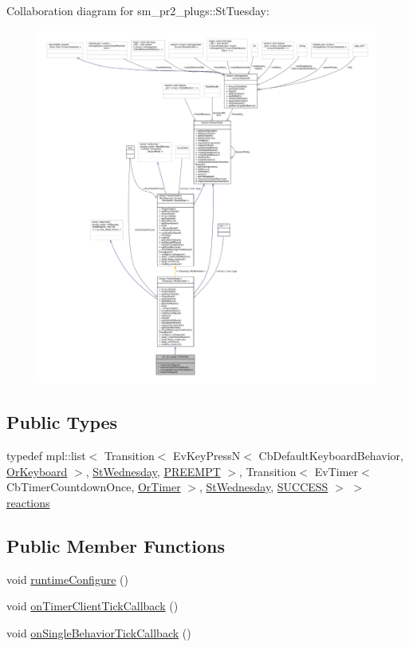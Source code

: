 Collaboration diagram for sm\+\_\+pr2\+\_\+plugs\+:\+:St\+Tuesday\+:
\nopagebreak
\begin{figure}[H]
\begin{center}
\leavevmode
\includegraphics[width=350pt]{structsm__pr2__plugs_1_1StTuesday__coll__graph}
\end{center}
\end{figure}
\subsection*{Public Types}
\begin{DoxyCompactItemize}
\item 
typedef mpl\+::list$<$ Transition$<$ Ev\+Key\+PressN$<$ Cb\+Default\+Keyboard\+Behavior, \hyperlink{classsm__pr2__plugs_1_1OrKeyboard}{Or\+Keyboard} $>$, \hyperlink{structsm__pr2__plugs_1_1StWednesday}{St\+Wednesday}, \hyperlink{classPREEMPT}{P\+R\+E\+E\+M\+PT} $>$, Transition$<$ Ev\+Timer$<$ Cb\+Timer\+Countdown\+Once, \hyperlink{classsm__pr2__plugs_1_1OrTimer}{Or\+Timer} $>$, \hyperlink{structsm__pr2__plugs_1_1StWednesday}{St\+Wednesday}, \hyperlink{classSUCCESS}{S\+U\+C\+C\+E\+SS} $>$ $>$ \hyperlink{structsm__pr2__plugs_1_1StTuesday_a3ee46b54b411275e6c623068895e7e1a}{reactions}
\end{DoxyCompactItemize}
\subsection*{Public Member Functions}
\begin{DoxyCompactItemize}
\item 
void \hyperlink{structsm__pr2__plugs_1_1StTuesday_a3773df05f080efdd418f48f49d07f4a8}{runtime\+Configure} ()
\item 
void \hyperlink{structsm__pr2__plugs_1_1StTuesday_a35fd270598e3750a7bc5a4a2ef4e4313}{on\+Timer\+Client\+Tick\+Callback} ()
\item 
void \hyperlink{structsm__pr2__plugs_1_1StTuesday_a62dd7fb3488631a3c366d30ef1b05d6f}{on\+Single\+Behavior\+Tick\+Callback} ()
\end{DoxyCompactItemize}
